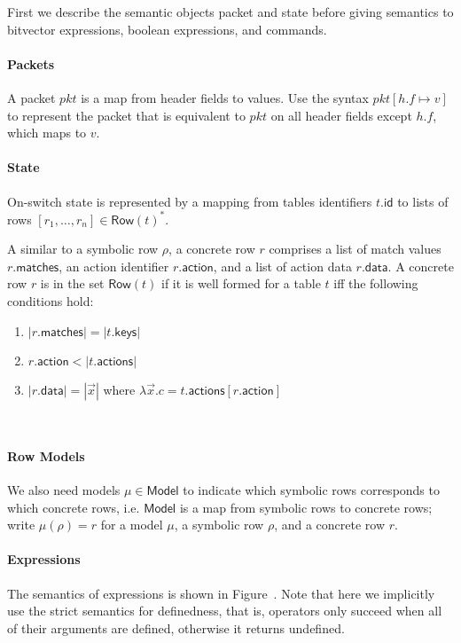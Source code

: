 \documentclass{article}
\newcommand{\pkt}{\mathit{pkt}}
\newcommand{\Model}{\mathsf{Model}}
\newcommand{\Row}{\mathsf{Row}}
\newcommand{\matches}{\mathsf{matches}}
\newcommand{\action}{\mathsf{action}}
\newcommand{\actions}{\mathsf{actions}}
\newcommand{\keys}{\mathsf{keys}}
\newcommand{\data}{\mathsf{data}}
\newcommand{\id}{\mathsf{id}}
\begin{document}
First we describe the semantic objects packet and state before giving semantics
to bitvector expressions, boolean expressions, and commands.

\paragraph{Packets}
A packet $\pkt$ is a map from header fields to values. Use the syntax $\pkt[h.f
  \mapsto v]$ to represent the packet that is equivalent to $\pkt$ on all header
fields except $h.f$, which maps to $v$.

\paragraph{State}
On-switch state is represented by a mapping from tables identifiers $t.\id$ to
lists of rows $[r_1,\ldots,r_n] \in \Row(t)^*$.

A similar to a symbolic row $\rho$, a concrete row $r$ comprises a list of match
values $r.\matches$, an action identifier $r.\action$, and a list of action data
$r.\data$. A concrete row $r$ is in the set $\Row(t)$ if it is well formed for a
table $t$ iff the following conditions hold:
\begin{enumerate}
\item $|r.\matches| = |t.\keys|$
\item $r.\action < |t.\actions|$
\item $|r.\data| = |\vec x|$ where $\lambda \vec x. c = t.\actions[r.\action]$
\end{enumerate}\

\paragraph{Row Models}
We also need models $\mu \in \Model$ to indicate which symbolic rows corresponds
to which concrete rows, i.e. $\Model$ is a map from symbolic rows to concrete
rows; write $\mu(\rho) = r$ for a model $\mu$, a symbolic row $\rho$, and a
concrete row $r$.

\paragraph{Expressions}
The semantics of expressions is shown in Figure~\label{fig:sem-expr}. Note that
here we implicitly use the strict semantics for definedness, that is, operators
only succeed when all of their arguments are defined, otherwise it returns
undefined.
\end{document}
